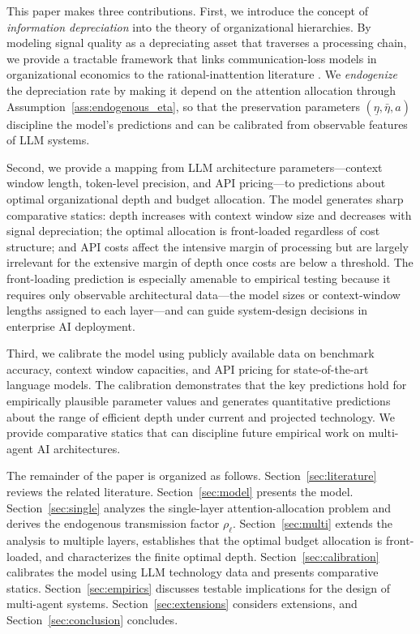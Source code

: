 This paper makes three contributions. First, we introduce the concept of \emph{information depreciation} into the theory of organizational hierarchies. By modeling signal quality as a depreciating asset that traverses a processing chain, we provide a tractable framework that links communication-loss models in organizational economics \citep{sah1991fallibility,dessein2002authority} to the rational-inattention literature \citep{sims2003implications}. We \emph{endogenize} the depreciation rate by making it depend on the attention allocation through Assumption~\ref{ass:endogenous_eta}, so that the preservation parameters $(\underline{\eta}, \bar{\eta}, a)$ discipline the model's predictions and can be calibrated from observable features of LLM systems.

Second, we provide a mapping from LLM architecture parameters---context window length, token-level precision, and API pricing---to predictions about optimal organizational depth and budget allocation. The model generates sharp comparative statics: depth increases with context window size and decreases with signal depreciation; the optimal allocation is front-loaded regardless of cost structure; and API costs affect the intensive margin of processing but are largely irrelevant for the extensive margin of depth once costs are below a threshold. The front-loading prediction is especially amenable to empirical testing because it requires only observable architectural data---the model sizes or context-window lengths assigned to each layer---and can guide system-design decisions in enterprise AI deployment.

Third, we calibrate the model using publicly available data on benchmark accuracy, context window capacities, and API pricing for state-of-the-art language models. The calibration demonstrates that the key predictions hold for empirically plausible parameter values and generates quantitative predictions about the range of efficient depth under current and projected technology. We provide comparative statics that can discipline future empirical work on multi-agent AI architectures.

The remainder of the paper is organized as follows. Section~\ref{sec:literature} reviews the related literature. Section~\ref{sec:model} presents the model. Section~\ref{sec:single} analyzes the single-layer attention-allocation problem and derives the endogenous transmission factor $\rho_\ell$. Section~\ref{sec:multi} extends the analysis to multiple layers, establishes that the optimal budget allocation is front-loaded, and characterizes the finite optimal depth. Section~\ref{sec:calibration} calibrates the model using LLM technology data and presents comparative statics. Section~\ref{sec:empirics} discusses testable implications for the design of multi-agent systems. Section~\ref{sec:extensions} considers extensions, and Section~\ref{sec:conclusion} concludes.
